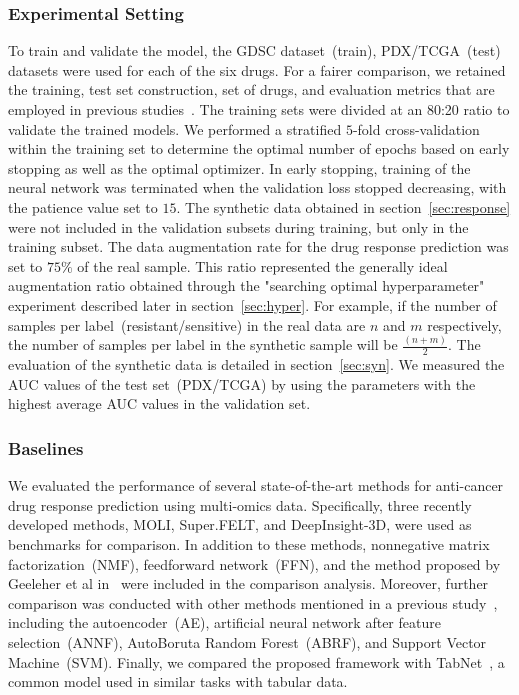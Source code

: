 \documentclass[runningheads]{llncs}
\begin{document}
\subsubsection{Experimental Setting}\label{sec:drugexp}

To train and validate the model, the GDSC dataset~(train), PDX/TCGA~(test) datasets were used for each of the six drugs. For a fairer comparison, we retained the training, test set construction, set of drugs, and evaluation metrics that are employed in previous studies~\cite{25,29,30}. The training sets were divided at an 80:20 ratio to validate the trained models. We performed a stratified $5$-fold cross-validation within the training set to determine the optimal number of epochs based on early stopping as well as the optimal optimizer. In early stopping, training of the neural network was terminated when the validation loss stopped decreasing, with the patience value set to $15$. The synthetic data obtained in section~\ref{sec:response} were not included in the validation subsets during training, but only in the training subset. The data augmentation rate for the drug response prediction was set to $75\%$ of the real sample. This ratio represented the generally ideal augmentation ratio obtained through
the "searching optimal hyperparameter" experiment described later in
section~\ref{sec:hyper}. For example, if the number of samples per
label~(resistant/sensitive) in the real data are $n$ and $m$ respectively, the number of samples per label in the synthetic sample will be $\frac{(n+m)}{2}$. The
evaluation of the synthetic data is detailed in section~\ref{sec:syn}. We
measured the AUC values of the test set~(PDX/TCGA) by using the
parameters with the highest average AUC values in the validation set.

\subsubsection{Baselines}

We evaluated the performance of several state-of-the-art methods for
anti-cancer drug response prediction using multi-omics
data. Specifically, three recently developed methods, MOLI,
Super.FELT, and DeepInsight-3D, were used as benchmarks for comparison. In addition to these methods, nonnegative matrix factorization~(NMF), feedforward network~(FFN), and the method proposed by Geeleher et al in~\cite{29} were included in the comparison analysis. Moreover, further comparison was conducted with other methods mentioned in a previous study~\cite{25}, including the autoencoder~(AE), artificial neural network after feature selection~(ANNF), AutoBoruta Random Forest~(ABRF), and Support Vector Machine~(SVM). Finally, we compared the proposed framework with TabNet~\cite{2}, a common model used in similar tasks with tabular data.
\end{document}
